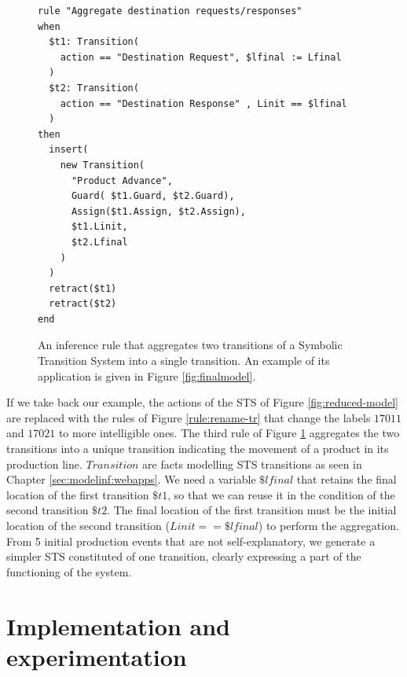 \begin{figure}[ht]
\begin{framed}
\begin{BVerbatim}
rule "Aggregate destination requests/responses"
when
  $t1: Transition(
    action == "Destination Request", $lfinal := Lfinal
  )
  $t2: Transition(
    action == "Destination Response" , Linit == $lfinal
  )
then
  insert(
    new Transition(
      "Product Advance",
      Guard( $t1.Guard, $t2.Guard),
      Assign($t1.Assign, $t2.Assign),
      $t1.Linit,
      $t2.Lfinal
    )
  )
  retract($t1)
  retract($t2)
end
\end{BVerbatim}
\end{framed}

  \caption{An inference rule that aggregates two transitions of a
  Symbolic Transition System into a single transition. An example
  of its application is given in Figure \ref{fig:finalmodel}.}
  \label{rule:aggregate-tr}
\end{figure}

If we take back our example, the actions of the STS of Figure
\ref{fig:reduced-model} are replaced with the rules of Figure
\ref{rule:rename-tr} that change the labels $17011$ and
$17021$ to more intelligible ones. The third rule of
Figure \ref{rule:aggregate-tr} aggregates the two transitions
into a unique transition indicating the movement of a product in
its production line. $Transition$ are facts modelling STS
transitions as seen in Chapter \ref{sec:modelinf:webapps}. We
need a variable $\$lfinal$ that retains the final location of the
first transition $\$t1$, so that we can reuse it in the condition
of the second transition $\$t2$. The final location of the first
transition must be the initial location of the second transition
($Linit == \$lfinal$) to perform the aggregation.
From 5 initial production events that are not self-explanatory,
we generate a simpler STS constituted of one transition, clearly
expressing a part of the functioning of the system.



\section{Implementation and experimentation}
\label{sec:modelinf:prodsystems:results}

